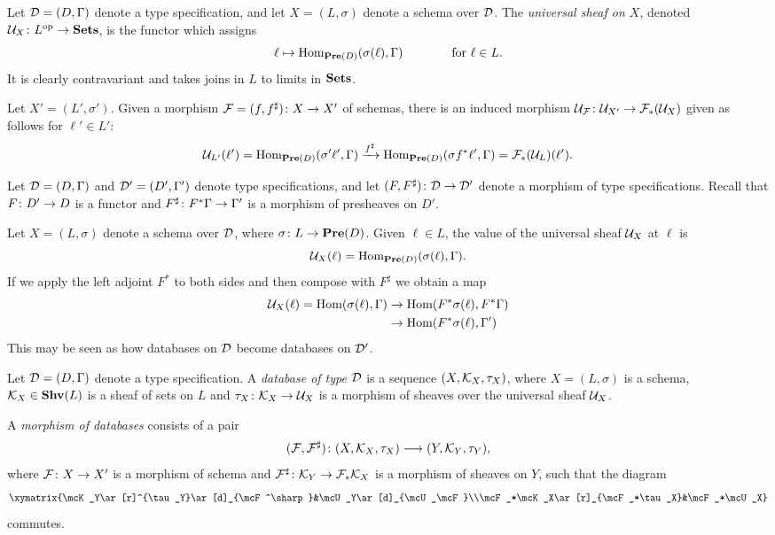 \documentclass{amsart}
\begin{document}
\begin{definition}

Let $\mathcal{D}=(D,\Gamma)$ denote a type specification, and let $X=(L,\sigma)$ denote a schema over $\mathcal{D}$.  The {\em universal sheaf on $X$}, denoted $\mathcal{U}_X\colon L^\textnormal{op}\rightarrow{\bf Sets}$, is the functor which assigns $$\ell\mapsto\textnormal{Hom}_{{\bf Pre}(D)}(\sigma(\ell),\Gamma) \hspace{.5in} \textnormal{ for } \ell\in L.$$   It is clearly contravariant and takes joins in $L$ to limits in ${\bf Sets}$.  

Let $X'=(L',\sigma')$.  Given a morphism $\mathcal{F}=(f,f^\sharp)\colon X\rightarrow X'$ of schemas, there is an induced morphism $\mathcal{U}_\mathcal{F}\colon\mathcal{U}_{X'}\rightarrow\mathcal{F}_*(\mathcal{U}_X)$ given as follows for $\ell'\in L'$: $$\mathcal{U}_{L'}(\ell')=\textnormal{Hom}_{{\bf Pre}(D)}(\sigma'\ell',\Gamma)\xrightarrow{f^\sharp}\textnormal{Hom}_{{\bf Pre}(D)}(\sigma f^*\ell',\Gamma)=\mathcal{F}_*(\mathcal{U}_L)(\ell').$$

\end{definition}

\begin{example}

Let $\mathcal{D}=(D,\Gamma)$ and $\mathcal{D}'=(D',\Gamma')$ denote type specifications, and let $(F,F^\sharp)\colon\mathcal{D}\rightarrow\mathcal{D}'$ denote a morphism of type specifications.  Recall that $F\colon D'\rightarrow D$ is a functor and $F^\sharp\colon F^*\Gamma\rightarrow\Gamma'$ is a morphism of presheaves on $D'$.

Let $X=(L,\sigma)$ denote a schema over $\mathcal{D}$, where $\sigma\colon L\rightarrow{\bf Pre}(D)$.  Given $\ell\in L$, the value of the universal sheaf $\mathcal{U}_X$ at $\ell$ is $$\mathcal{U}_X(\ell)=\textnormal{Hom}_{{\bf Pre}(D)}(\sigma(\ell),\Gamma).$$  If we apply the left adjoint $F^*$ to both sides and then compose with $F^\sharp$ we obtain a map \begin{align*}\mathcal{U}_X(\ell)=\textnormal{Hom}(\sigma(\ell),\Gamma)&\rightarrow\textnormal{Hom}(F^*\sigma(\ell),F^*\Gamma)\\&\rightarrow\textnormal{Hom}(F^*\sigma(\ell),\Gamma')\end{align*}  This may be seen as how databases on $\mathcal{D}$ become databases on $\mathcal{D}'$.

\end{example}

\begin{definition}

Let $\mathcal{D}=(D,\Gamma)$ denote a type specification.  A {\em database of type $\mathcal{D}$} is a sequence $(X,\mathcal{K}_X,\tau_X)$, where $X=(L,\sigma)$ is a schema, $\mathcal{K}_X\in{\bf Shv}(L)$ is a sheaf of sets on $L$ and $\tau_X\colon\mathcal{K}_X\rightarrow\mathcal{U}_X$ is a morphism of sheaves over the universal sheaf $\mathcal{U}_X$.

A {\em morphism of databases} consists of a pair $$(\mathcal{F},\mathcal{F}^\sharp)\colon(X,\mathcal{K}_X,\tau_X)\longrightarrow(Y,\mathcal{K}_Y,\tau_Y),$$ where $\mathcal{F}\colon X\rightarrow X'$ is a morphism of schema and $\mathcal{F}^\sharp\colon \mathcal{K}_Y\rightarrow\mathcal{F}_*\mathcal{K}_X$ is a morphism of sheaves on $Y$, such that the diagram $$\xymatrix{\mcK_Y\ar[r]^{\tau_Y}\ar[d]_{\mcF^\sharp}&\mcU_Y\ar[d]_{\mcU_\mcF}\\\mcF_*\mcK_X\ar[r]_{\mcF_*\tau_X}&\mcF_*\mcU_X}$$ commutes.

\end{definition}
\end{document}
